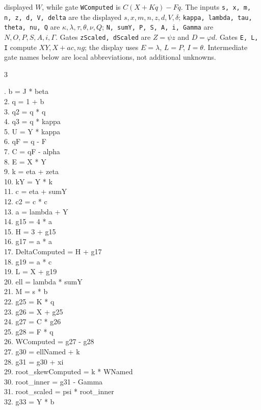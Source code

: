 \documentclass[10pt]{article}
\begin{document}
displayed $W$, while gate \texttt{WComputed} is $C(X+Kq)-Fq$. The inputs
\texttt{s, x, m, n, z, d, V, delta} are the displayed
$s,x,m,n,z,d,V,\delta$; \texttt{kappa, lambda, tau, theta, nu, Q}
are $\kappa,\lambda,\tau,\theta,\nu,Q$; \texttt{N, sumY, P, S, A, i, Gamma}
are $N,O,P,S,A,i,\Gamma$. Gates \texttt{zScaled, dScaled} are $Z=\psi z$ and $D=\varphi d$. Gates \texttt{E, L, I} compute $XY,X+ac,ng$;
the display uses $E=\lambda$, $L=P$, $I=\theta$. Intermediate gate
names below are local abbreviations, not additional unknowns.
\begin{multicols}{3}
\raggedright\ttfamily\fontsize{6.2}{7.1}. b = J * beta\\
2. q = 1 + b\\
3. q2 = q * q\\
4. q3 = q * kappa\\
5. U = Y * kappa\\
6. qF = q - F\\
7. C = qF - alpha\\
8. E = X * Y\\
9. k = eta + zeta\\
10. kY = Y * k\\
11. c = eta + sumY\\
12. c2 = c * c\\
13. a = lambda + Y\\
14. g15 = 4 * a\\
15. H = 3 + g15\\
16. g17 = a * a\\
17. DeltaComputed = H + g17\\
18. g19 = a * c\\
19. L = X + g19\\
20. ell = lambda * sumY\\
21. M = s * b\\
22. g25 = K * q\\
23. g26 = X + g25\\
24. g27 = C * g26\\
25. g28 = F * q\\
26. WComputed = g27 - g28\\
27. g30 = ellNamed + k\\
28. g31 = g30 + xi\\
29. root\_skewComputed = k * WNamed\\
30. root\_inner = g31 - Gamma\\
31. root\_scaled = psi * root\_inner\\
32. g33 = Y * b\\

\end{multicols}
\end{document}
